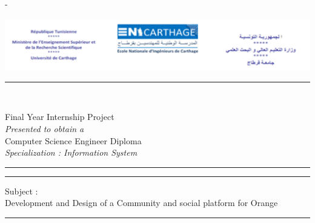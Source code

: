 %
%
% 
%
%
\begin{titlingpage}
\begin{SingleSpace}
\calccentering{\unitlength} 
\begin{adjustwidth*}{\unitlength}{-\unitlength}
\begin{center}
\includegraphics[scale=0.5]{logos/Entete}\\
{\color{cyan}\rule[0.5ex]{\linewidth}{1pt}\\[\baselineskip]}
{\HUGE Final Year Internship Project }\\[4mm]
{\normalsize \textit{Presented to obtain a }}\\[3mm]
{\LARGE Computer Science Engineer Diploma }\\[3mm]
{\normalsize \textit{ Specialization : Information System }}\\[4mm]

{\color{cyan}\rule[0.5ex]{\linewidth}{2pt}\vspace*{-\baselineskip}\vspace{3.2pt}}
{\color{cyan}\rule[0.5ex]{\linewidth}{0.5pt}}


{\normalsize Subject :}\\[3mm]
{\LARGE Development and Design of a Community and social platform for Orange }\\


{\color{cyan}\rule[0.5ex]{\linewidth}{0.5pt}\vspace*{-\baselineskip}\vspace{3.2pt}}


\end{center}
\end{adjustwidth*}
\end{SingleSpace}
\end{titlingpage}
